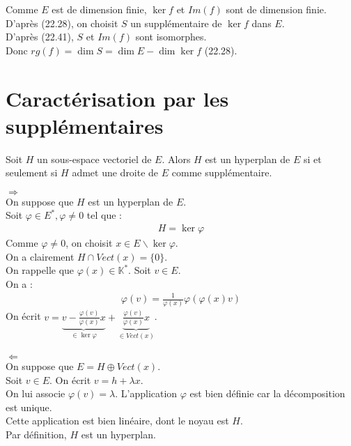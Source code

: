 \documentclass[../main.tex]{subfiles}
\begin{document}
\noindent Comme $E$ est de dimension finie, $\ker f$ et $Im(f)$ sont de dimension finie. \\
D'après (22.28), on choisit $S$ un supplémentaire de $\ker f$ dans $E$. \\
D'après (22.41), $S$ et $Im(f)$ sont isomorphes. \\
Donc $rg(f) = \dim S = \dim E - \dim \ker f$ (22.28). 

\section{Caractérisation par les supplémentaires}
\begin{tcolorbox}[title=Théorème 22.53, title filled=false, colframe=orange, colback=orange!10!white]
    Soit $H$ un sous-espace vectoriel de $E$. Alors $H$ est un hyperplan de $E$ si et seulement si $H$ admet une droite de $E$ comme supplémentaire. 
\end{tcolorbox}

$\boxed{\Rightarrow}$ \\
On suppose que $H$ est un hyperplan de $E$. \\
Soit $\varphi \in E^*, \varphi \neq 0$ tel que : 
\begin{align*}
    H = \ker \varphi
\end{align*}
Comme $\varphi \neq 0$, on choisit $x\in E \backslash \ker \varphi$. \\
On a clairement $H \cap Vect(x) = \{0\}$. \\
On rappelle que $\varphi(x) \in \mathbb{K}^*$. Soit $v\in E$. \\
On a : 
\begin{align*}
    \varphi(v) = \frac{1}{\varphi(x)} \varphi(\varphi(x)v)
\end{align*}
On écrit $v =  \underbrace{v - \frac{\varphi(v)}{\varphi(x)} x}_{\in \ker \varphi} + \underbrace{\frac{\varphi(v)}{\varphi(x)} x}_{\in Vect(x)}$. \\ \\

$\boxed{\Leftarrow}$ \\
On suppose que $E = H \oplus Vect(x)$. \\
Soit $v\in E$. On écrit $v = h + \lambda x$. \\
On lui associe $\varphi(v) = \lambda$. L'application $\varphi$ est bien définie car la décomposition est unique. \\
Cette application est bien linéaire, dont le noyau est $H$. \\
Par définition, $H$ est un hyperplan. 
\end{document}
